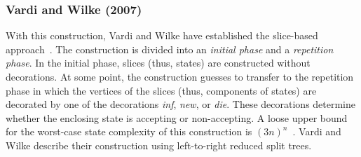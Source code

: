 


\subsubsection{Vardi and Wilke (2007)}
\label{2_vw07}
With this construction, Vardi and Wilke have established the slice-based approach~\cite{2011_tsai}. The construction is divided into an \textit{initial phase} and a \textit{repetition phase}. In the initial phase, slices (thus, states) are constructed without decorations. At some point, the construction guesses to transfer to the repetition phase in which the vertices of the slices (thus, components of states) are decorated by one of the decorations \textit{inf}, \textit{new}, or \textit{die}. These decorations determine whether the enclosing state is accepting or non-accepting. A loose upper bound for the worst-case state complexity of this construction is $(3n)^n$~\cite{vardi2007automata}. Vardi and Wilke describe their construction using left-to-right reduced split trees.



